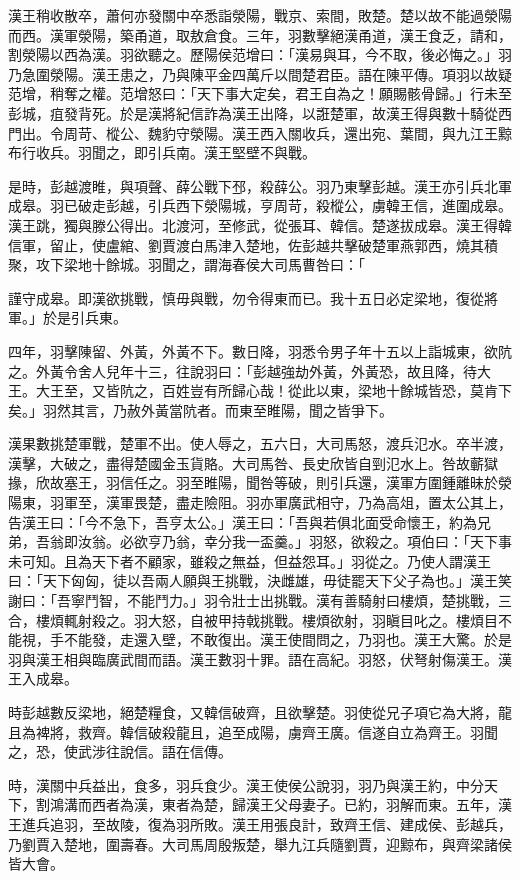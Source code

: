\begin{pinyinscope}
漢王稍收散卒，蕭何亦發關中卒悉詣滎陽，戰京、索間，敗楚。楚以故不能過滎陽而西。漢軍滎陽，築甬道，取敖倉食。三年，羽數擊絕漢甬道，漢王食乏，請和，割滎陽以西為漢。羽欲聽之。歷陽侯范增曰：「漢易與耳，今不取，後必悔之。」羽乃急圍滎陽。漢王患之，乃與陳平金四萬斤以間楚君臣。語在陳平傳。項羽以故疑范增，稍奪之權。范增怒曰：「天下事大定矣，君王自為之！願賜骸骨歸。」行未至彭城，疽發背死。於是漢將紀信詐為漢王出降，以誑楚軍，故漢王得與數十騎從西門出。令周苛、樅公、魏豹守滎陽。漢王西入關收兵，還出宛、葉間，與九江王黥布行收兵。羽聞之，即引兵南。漢王堅壁不與戰。

是時，彭越渡睢，與項聲、薛公戰下邳，殺薛公。羽乃東擊彭越。漢王亦引兵北軍成皋。羽已破走彭越，引兵西下滎陽城，亨周苛，殺樅公，虜韓王信，進圍成皋。漢王跳，獨與滕公得出。北渡河，至修武，從張耳、韓信。楚遂拔成皋。漢王得韓信軍，留止，使盧綰、劉賈渡白馬津入楚地，佐彭越共擊破楚軍燕郭西，燒其積聚，攻下梁地十餘城。羽聞之，謂海春侯大司馬曹咎曰：「

謹守成皋。即漢欲挑戰，慎毋與戰，勿令得東而已。我十五日必定梁地，復從將軍。」於是引兵東。

四年，羽擊陳留、外黃，外黃不下。數日降，羽悉令男子年十五以上詣城東，欲阬之。外黃令舍人兒年十三，往說羽曰：「彭越強劫外黃，外黃恐，故且降，待大王。大王至，又皆阬之，百姓豈有所歸心哉！從此以東，梁地十餘城皆恐，莫肯下矣。」羽然其言，乃赦外黃當阬者。而東至睢陽，聞之皆爭下。

漢果數挑楚軍戰，楚軍不出。使人辱之，五六日，大司馬怒，渡兵氾水。卒半渡，漢擊，大破之，盡得楚國金玉貨賂。大司馬咎、長史欣皆自剄氾水上。咎故蘄獄掾，欣故塞王，羽信任之。羽至睢陽，聞咎等破，則引兵還，漢軍方圍鍾離昧於滎陽東，羽軍至，漢軍畏楚，盡走險阻。羽亦軍廣武相守，乃為高俎，置太公其上，告漢王曰：「今不急下，吾亨太公。」漢王曰：「吾與若俱北面受命懷王，約為兄弟，吾翁即汝翁。必欲亨乃翁，幸分我一盃羹。」羽怒，欲殺之。項伯曰：「天下事未可知。且為天下者不顧家，雖殺之無益，但益怨耳。」羽從之。乃使人謂漢王曰：「天下匈匈，徒以吾兩人願與王挑戰，決雌雄，毋徒罷天下父子為也。」漢王笑謝曰：「吾寧鬥智，不能鬥力。」羽令壯士出挑戰。漢有善騎射曰樓煩，楚挑戰，三合，樓煩輒射殺之。羽大怒，自被甲持戟挑戰。樓煩欲射，羽瞋目叱之。樓煩目不能視，手不能發，走還入壁，不敢復出。漢王使間問之，乃羽也。漢王大驚。於是羽與漢王相與臨廣武間而語。漢王數羽十罪。語在高紀。羽怒，伏弩射傷漢王。漢王入成皋。

時彭越數反梁地，絕楚糧食，又韓信破齊，且欲擊楚。羽使從兄子項它為大將，龍且為裨將，救齊。韓信破殺龍且，追至成陽，虜齊王廣。信遂自立為齊王。羽聞之，恐，使武涉往說信。語在信傳。

時，漢關中兵益出，食多，羽兵食少。漢王使侯公說羽，羽乃與漢王約，中分天下，割鴻溝而西者為漢，東者為楚，歸漢王父母妻子。已約，羽解而東。五年，漢王進兵追羽，至故陵，復為羽所敗。漢王用張良計，致齊王信、建成侯、彭越兵，乃劉賈入楚地，圍壽春。大司馬周殷叛楚，舉九江兵隨劉賈，迎黥布，與齊梁諸侯皆大會。


\end{pinyinscope}
